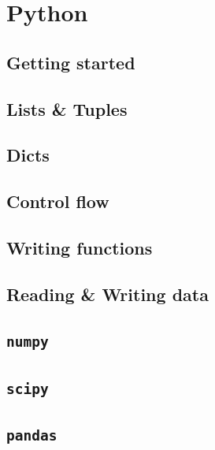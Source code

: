 \documentclass[
]{book}
\begin{document}
\hypertarget{python}{%
\chapter{Python}\label{python}}

\hypertarget{getting-started-with-python}{%
\section{Getting started}\label{getting-started-with-python}}

\hypertarget{p-lists-and-tuples}{%
\section{Lists \& Tuples}\label{p-lists-and-tuples}}

\hypertarget{p-dicts}{%
\section{Dicts}\label{p-dicts}}

\hypertarget{p-control-flow}{%
\section{Control flow}\label{p-control-flow}}

\hypertarget{p-writing-functions}{%
\section{Writing functions}\label{p-writing-functions}}

\hypertarget{p-reading-and-writing-data}{%
\section{Reading \& Writing data}\label{p-reading-and-writing-data}}

\hypertarget{p-numpy}{%
\section{\texorpdfstring{\texttt{numpy}}{numpy}}\label{p-numpy}}

\hypertarget{p-scipy}{%
\section{\texorpdfstring{\texttt{scipy}}{scipy}}\label{p-scipy}}

\hypertarget{p-pandas}{%
\section{\texorpdfstring{\texttt{pandas}}{pandas}}\label{p-pandas}}
\end{document}

